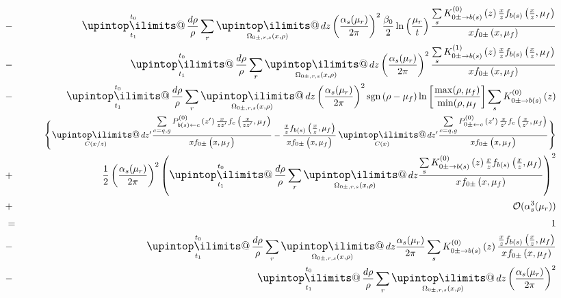 \documentclass[a4paper,11pt]{article}
\makeatletter
\newcommand{\mksmall}[1]{\textnormal{\smaller$#1$}}
\newcommand{\sgn}[2]{\mathrm{sgn}\left(#1-#2\right)}
\newcommand{\xfhat}[3]{#2 \widehat{f}_{#1}\left(#2, #3\right)}
\newcommand{\xf}[3]{#2 f_{#1}\left(#2, #3\right)}
\newcommand{\lodglapkernel}[3]{P_{#1\leftarrow #2}^{(0)}\left(#3\right)}
\newcommand{\lopskernel}[3]{K_{#1\rightarrow #2}^{(0)}\left(#3\right)}
\newcommand{\nlopskernel}[3]{K_{#1\rightarrow #2}^{(1)}\left(#3\right)}
\newcommand{\upint}{\DOTSI\upintop\ilimits@}
\renewcommand{\int}{\mathop{\mathlarger{\upint}}}
\makeatother
\begin{document}
\begin{eqnarray*}
&-&
\int\displaylimits_{t_1}^{t_0} \frac{d\rho}{\rho} \sum\limits_{r} \int\displaylimits_{\Omega_{0\pm,r,s}(x,\rho)} dz
\left(\frac{\alpha_s(\mu_r)}{2\pi}\right)^2
\frac{\beta_0}{2}\ln\left(\frac{\mu_r}{t}\right)
\frac{\sum\limits_s\lopskernel{0\pm}{b(s)}{z} \xf{b(s)}{\frac{x}{z}}{\mu_f}}{\xf{0\pm}{x}{\mu_f}}
\\
&-&
\int\displaylimits_{t_1}^{t_0} \frac{d\rho}{\rho} \sum\limits_{r} \int\displaylimits_{\Omega_{0\pm,r,s}(x,\rho)} dz
\left(\frac{\alpha_s(\mu_r)}{2\pi}\right)^2
\frac{\sum\limits_s\nlopskernel{0\pm}{b(s)}{z} \xf{b(s)}{\frac{x}{z}}{\mu_f}}{\xf{0\pm}{x}{\mu_f}} 
\\
&-&
\int\displaylimits_{t_1}^{t_0} \frac{d\rho}{\rho} \sum\limits_{r} \int\displaylimits_{\Omega_{0\pm,r,s}(x,\rho)} dz
\left(\frac{\alpha_s(\mu_r)}{2\pi}\right)^2
\sgn{\rho}{\mu_f}
\ln\left[\frac{\max(\rho,\mu_f)}{\min(\rho,\mu_f}\right]
\sum\limits_s \lopskernel{0\pm}{b(s)}{z}
\\&&\qquad
\Bigg\{
\mksmall{\int\displaylimits_{C(x/z)}  dz' 
\frac{ \sum\limits_{c=q,g} \lodglapkernel{b(s)}{c}{z'} \xf{c}{\frac{x}{zz'}}{\mu_f} }{\xf{0\pm}{x}{\mu_f}}
 -
\frac{ \xf{b(s)}{\frac{x}{z}}{\mu_f} }{\xf{0\pm}{x}{\mu_f}}
\int\displaylimits_{C(x)}  dz' 
\frac{  \sum\limits_{c=q,g} \lodglapkernel{0\pm}{c}{z'} \xf{c}{\frac{x}{z'}}{\mu_f}}{\xf{0\pm}{x}{\mu_f}}
}
\Bigg\}
\\&+&
\frac{1}{2}
\left(\frac{\alpha_s(\mu_r)}{2\pi}\right)^2
\left(
\int\displaylimits_{t_1}^{t_0} \frac{d\rho}{\rho} \sum\limits_{r} \int\displaylimits_{\Omega_{0\pm,r,s}(x,\rho)} dz
\frac{\sum\limits_s\lopskernel{0\pm}{b(s)}{z} \xf{b(s)}{\frac{x}{z}}{\mu_f}}{\xf{0\pm}{x}{\mu_f}} 
\right)^2
\\
&+&
\mathcal{O}(\alpha_s^3(\mu_r))
%
%
%
%
\\
&=& 1
%
%
%
\\
&-&
\int\displaylimits_{t_1}^{t_0} \frac{d\rho}{\rho} \sum\limits_{r}\int\displaylimits_{\Omega_{0\pm,r,s}(x,\rho)} dz
\frac{\alpha_s(\mu_r)}{2\pi}
\sum\limits_s\lopskernel{0\pm}{b(s)}{z}
\frac{\xf{b(s)}{\frac{x}{z}}{\mu_f}}{\xf{0\pm}{x}{\mu_f}} 
\\
&-&
\int\displaylimits_{t_1}^{t_0} \frac{d\rho}{\rho} \sum\limits_{r}\int\displaylimits_{\Omega_{0\pm,r,s}(x,\rho)} dz
\left(\frac{\alpha_s(\mu_r)}{2\pi}\right)^2

\end{eqnarray*}
\end{document}
